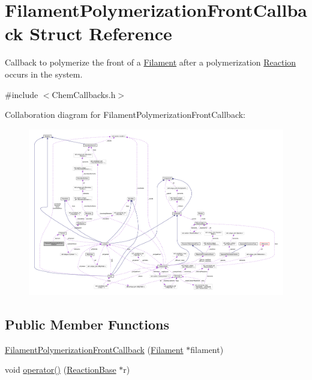 \hypertarget{structFilamentPolymerizationFrontCallback}{\section{Filament\+Polymerization\+Front\+Callback Struct Reference}
\label{structFilamentPolymerizationFrontCallback}
}


Callback to polymerize the front of a \hyperlink{classFilament}{Filament} after a polymerization \hyperlink{classReaction}{Reaction} occurs in the system.  




{\ttfamily \#include $<$Chem\+Callbacks.\+h$>$}



Collaboration diagram for Filament\+Polymerization\+Front\+Callback\+:
\nopagebreak
\begin{figure}[H]
\begin{center}
\leavevmode
\includegraphics[width=350pt]{structFilamentPolymerizationFrontCallback__coll__graph}
\end{center}
\end{figure}
\subsection*{Public Member Functions}
\begin{DoxyCompactItemize}
\item 
\hyperlink{structFilamentPolymerizationFrontCallback_aef1d6c929cc7e0e4c6da2cb55d086cc4}{Filament\+Polymerization\+Front\+Callback} (\hyperlink{classFilament}{Filament} $\ast$filament)
\item 
void \hyperlink{structFilamentPolymerizationFrontCallback_a70946cc065011fe2042a0d8e8d69ddfa}{operator()} (\hyperlink{classReactionBase}{Reaction\+Base} $\ast$r)
\end{DoxyCompactItemize}
